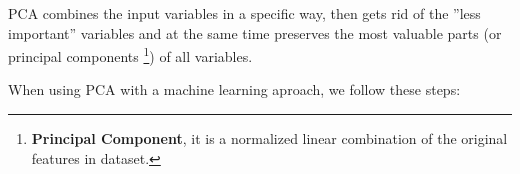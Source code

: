 \vspace{5mm} %

PCA combines the input variables in a specific way, then gets rid of the ''less important'' variables and at the same time preserves the most valuable parts (or principal components \footnote{\textbf{Principal Component}, it is a normalized linear combination of the original features in dataset.}) of all variables.

\vspace{5mm} %

When using PCA with a machine learning aproach, we follow these steps:

